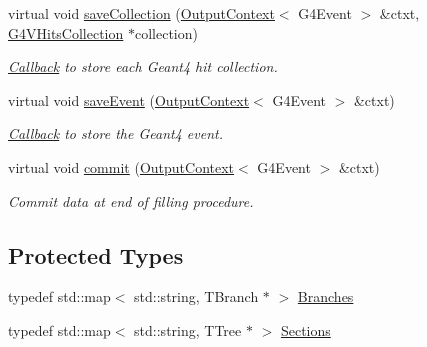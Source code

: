 \begin{DoxyCompactItemize}
virtual void \hyperlink{class_d_d4hep_1_1_simulation_1_1_geant4_output2_r_o_o_t_a1f61031bde79ed84a62145cb32ac4428}{save\+Collection} (\hyperlink{class_d_d4hep_1_1_simulation_1_1_geant4_output_action_1_1_output_context}{Output\+Context}$<$ G4\+Event $>$ \&ctxt, \hyperlink{class_g4_v_hits_collection}{G4\+V\+Hits\+Collection} $\ast$collection)
\begin{DoxyCompactList}\small\item\em \hyperlink{class_d_d4hep_1_1_callback}{Callback} to store each Geant4 hit collection. \end{DoxyCompactList}\item 
virtual void \hyperlink{class_d_d4hep_1_1_simulation_1_1_geant4_output2_r_o_o_t_a0562da9b5fdb0f81fa8d14457fd3f319}{save\+Event} (\hyperlink{class_d_d4hep_1_1_simulation_1_1_geant4_output_action_1_1_output_context}{Output\+Context}$<$ G4\+Event $>$ \&ctxt)
\begin{DoxyCompactList}\small\item\em \hyperlink{class_d_d4hep_1_1_callback}{Callback} to store the Geant4 event. \end{DoxyCompactList}\item 
virtual void \hyperlink{class_d_d4hep_1_1_simulation_1_1_geant4_output2_r_o_o_t_a06090a17c7d266dcdfb7b2b180aeaffe}{commit} (\hyperlink{class_d_d4hep_1_1_simulation_1_1_geant4_output_action_1_1_output_context}{Output\+Context}$<$ G4\+Event $>$ \&ctxt)
\begin{DoxyCompactList}\small\item\em Commit data at end of filling procedure. \end{DoxyCompactList}\end{DoxyCompactItemize}
\subsection*{Protected Types}
\begin{DoxyCompactItemize}
\item 
typedef std\+::map$<$ std\+::string, T\+Branch $\ast$ $>$ \hyperlink{class_d_d4hep_1_1_simulation_1_1_geant4_output2_r_o_o_t_a7c5890a17d3f70ce65703cdbec3cf53c}{Branches}
\item 
typedef std\+::map$<$ std\+::string, T\+Tree $\ast$ $>$ \hyperlink{class_d_d4hep_1_1_simulation_1_1_geant4_output2_r_o_o_t_a6bee4e4ece80aae4e2e07295486f8cd0}{Sections}
\end{DoxyCompactItemize}
